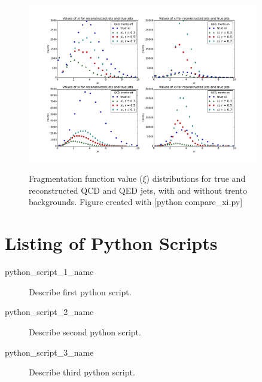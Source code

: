 \documentclass[11pt]{article}
\begin{document}
\begin{figure}[h]
\begin{center}
\includegraphics[width=0.9\textwidth]{compare_xi.pdf}
\label{fig_label}
\caption{Fragmentation function value ($\xi$) distributions for true and reconstructed QCD and QED jets, with and without trento backgrounds.  Figure created with [python compare\_xi.py]}
\end{center}
\end{figure}

\appendix

\section{Listing of Python Scripts}
\begin{description}
\item[python\_script\_1\_name] Describe first python script.
\item[python\_script\_2\_name] Describe second python script.
\item[python\_script\_3\_name] Describe third python script.

\end{description}
\end{document}
